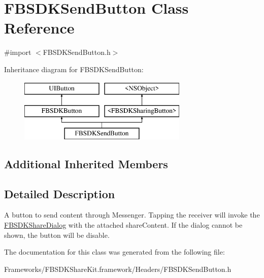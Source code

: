 \hypertarget{interface_f_b_s_d_k_send_button}{}\section{F\+B\+S\+D\+K\+Send\+Button Class Reference}
\label{interface_f_b_s_d_k_send_button}


{\ttfamily \#import $<$F\+B\+S\+D\+K\+Send\+Button.\+h$>$}

Inheritance diagram for F\+B\+S\+D\+K\+Send\+Button\+:\begin{figure}[H]
\begin{center}
\leavevmode
\includegraphics[height=3.000000cm]{interface_f_b_s_d_k_send_button}
\end{center}
\end{figure}
\subsection*{Additional Inherited Members}


\subsection{Detailed Description}
A button to send content through Messenger.  Tapping the receiver will invoke the \hyperlink{interface_f_b_s_d_k_share_dialog}{F\+B\+S\+D\+K\+Share\+Dialog} with the attached share\+Content. If the dialog cannot be shown, the button will be disable. 

The documentation for this class was generated from the following file\+:\begin{DoxyCompactItemize}
\item 
Frameworks/\+F\+B\+S\+D\+K\+Share\+Kit.\+framework/\+Headers/F\+B\+S\+D\+K\+Send\+Button.\+h\end{DoxyCompactItemize}
